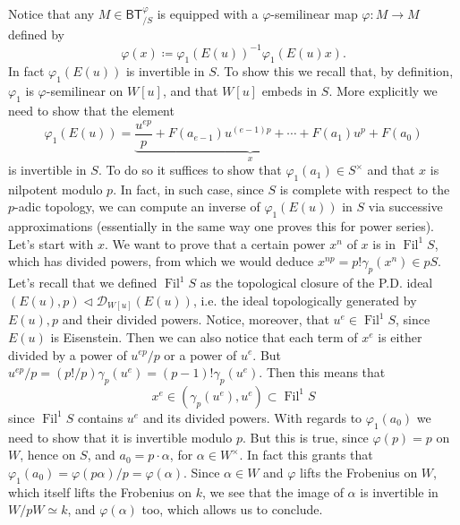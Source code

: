 \begin{rem}[]\label{invertibilityphi1E(u))}
	Notice that any $M \in \mathsf{BT}^{\varphi}_{/S}$ is equipped with a 
	$\varphi$-semilinear map $\varphi\colon M \to M$ defined by
	\begin{equation*}
		\varphi (x) \coloneqq \varphi_1 \left( E(u) \right)^{-1} \varphi_1 (E(u)x)
	.\end{equation*}
	In fact $\varphi_1(E(u))$ is invertible in $S$.
	To show this we recall that, by definition, $\varphi_1$ is
	$\varphi$-semilinear on $W[u]$, and that $W[u]$ embeds in $S$.
	More explicitly we need to show that the element
	\begin{equation*}
		\varphi_1(E(u)) =
		\underbrace{\frac{ u^{ep} }{ p } + F(a_{e-1}) u^{(e-1)p} +
		\cdots + F(a_1)u^p}_{x} + F(a_0)
	\end{equation*}
	is invertible in $S$.
	To do so it suffices to show that $\varphi_1(a_1) \in S^{\times}$ and
	that $x$ is nilpotent modulo $p$. 
	In fact, in such case, since $S$ is complete with respect to the
	$p$-adic topology, we can compute an inverse of $\varphi_1(E(u))$
	in $S$ via successive approximations (essentially in the same
	way one proves this for power series).
	Let's start with $x$.
	We want to prove that a certain power $x^n$ of $x$
	is in $\operatorname{Fil}^1S$, which has divided powers,
	from which we would deduce $x^{np} = p! \gamma_p(x^n) \in pS$.
	Let's recall that we defined $\operatorname{Fil}^1S$ as the topological
	closure of the P.D. ideal $(E(u),p) \triangleleft \mathcal{D}_{W[u]}(E(u))$,
	i.e. the ideal topologically generated by $E(u), p$ and their divided powers.
	Notice, moreover, that $u^e \in \operatorname{Fil}^1S$, since $E(u)$ is
	Eisenstein.
	Then we can also notice that each term of $x^e$ is either divided by
	a power of $u^{ep}/p$ or a power of $u^e$.
	But $u^{ep}/p = (p!/p) \gamma_p(u^e) = (p-1)! \gamma_p(u^e)$.
	Then this means that
	\begin{equation*}
		x^e \in \left( \gamma_p(u^e), u^e \right) \subset \operatorname{Fil}^1S
	\end{equation*}
	since $\operatorname{Fil}^1S$ contains $u^e$ and its divided powers.
	With regards to $\varphi_1(a_0)$ we need to show that it 
	is invertible modulo $p$.
	But this is true, since $\varphi(p) = p$ on $W$, hence on $S$,
	and $a_0 = p \cdot \alpha$, for $\alpha \in W^{\times}$.
	In fact this grants that $\varphi_1(a_0) = \varphi(p \alpha)/p = \varphi(\alpha)$.
	Since $\alpha \in W$ and $\varphi$ lifts the Frobenius on $W$,
	which itself lifts the Frobenius on $k$, we see that the image
	of $\alpha$ is invertible in $W/pW \simeq k$, and $\varphi(\alpha)$ too,
	which allows us to conclude.
\end{rem}


